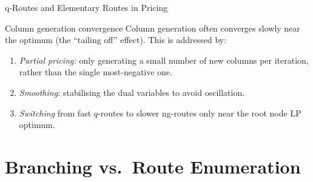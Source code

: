 \documentclass[aspectratio=169,10pt]{beamer}
\begin{document}
\begin{frame}[allowframebreaks]{q-Routes and Elementary Routes in Pricing}
\begin{alertblock}{Column generation convergence}
Column generation often converges slowly near the optimum (the ``tailing
off'' effect). This is addressed by:
\begin{enumerate}
  \item \emph{Partial pricing:} only generating a small number of new
        columns per iteration, rather than the single most-negative one.
  \item \emph{Smoothing:} stabilising the dual variables to avoid
        oscillation.
  \item \emph{Switching} from fast $q$-routes to slower ng-routes only
        near the root node LP optimum.
\end{enumerate}
\end{alertblock}

\end{frame}

\section{Branching vs.\ Route Enumeration}
\end{document}
